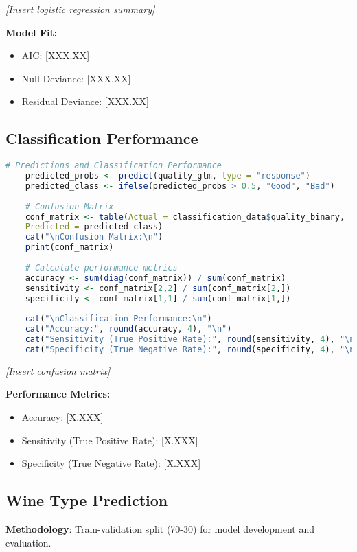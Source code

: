 \textit{[Insert logistic regression summary]}

\textbf{Model Fit:}
\begin{itemize}
	\item AIC: [XXX.XX]
	\item Null Deviance: [XXX.XX]
	\item Residual Deviance: [XXX.XX]
\end{itemize}

\subsection{Classification Performance}

\begin{lstlisting}[language=R, caption=Classification Performance Evaluation, breaklines=true]
	# Predictions and Classification Performance
	predicted_probs <- predict(quality_glm, type = "response")
	predicted_class <- ifelse(predicted_probs > 0.5, "Good", "Bad")
	
	# Confusion Matrix
	conf_matrix <- table(Actual = classification_data$quality_binary, 
	Predicted = predicted_class)
	cat("\nConfusion Matrix:\n")
	print(conf_matrix)
	
	# Calculate performance metrics
	accuracy <- sum(diag(conf_matrix)) / sum(conf_matrix)
	sensitivity <- conf_matrix[2,2] / sum(conf_matrix[2,])
	specificity <- conf_matrix[1,1] / sum(conf_matrix[1,])
	
	cat("\nClassification Performance:\n")
	cat("Accuracy:", round(accuracy, 4), "\n")
	cat("Sensitivity (True Positive Rate):", round(sensitivity, 4), "\n")
	cat("Specificity (True Negative Rate):", round(specificity, 4), "\n")
\end{lstlisting}

\textit{[Insert confusion matrix]}

\textbf{Performance Metrics:}
\begin{itemize}
	\item Accuracy: [X.XXX]
	\item Sensitivity (True Positive Rate): [X.XXX]
	\item Specificity (True Negative Rate): [X.XXX]
\end{itemize}

\subsection{Wine Type Prediction}

\textbf{Methodology}: Train-validation split (70-30) for model development and evaluation.

